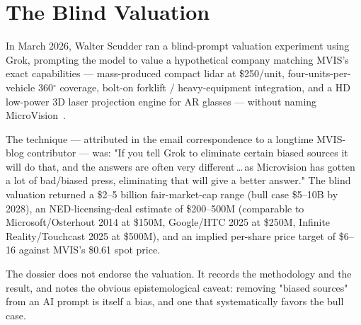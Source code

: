 \documentclass[10pt,letterpaper,twocolumn]{article}
\begin{document}
\begin{table}[h]
\footnotesize
\centering
\setlength{\tabcolsep}{4pt}
\caption{Acquirability arithmetic. AIM's own \$50M raise is small for an outright \$190M acquisition; a syndicate-led deal led by DCVC and one or more of AIM's other backers is more likely, or a deep partnership / licensing arrangement that precedes an acquisition.}
\label{tab:aim}
\end{table}

\section{The Blind Valuation}

In March 2026, Walter Scudder ran a blind-prompt valuation experiment using Grok, prompting the model to value a hypothetical company matching MVIS's exact capabilities --- mass-produced compact lidar at \$250/unit, four-units-per-vehicle 360\(^\circ\) coverage, bolt-on forklift / heavy-equipment integration, and a HD low-power 3D laser projection engine for AR glasses --- without naming MicroVision~\citep{scudder2026grok}.

The technique --- attributed in the email correspondence to a longtime MVIS-blog contributor --- was: "If you tell Grok to eliminate certain biased sources it will do that, and the answers are often very different\,\ldots\,as Microvision has gotten a lot of bad/biased press, eliminating that will give a better answer." The blind valuation returned a \$2--5 billion fair-market-cap range (bull case \$5--10B by 2028), an NED-licensing-deal estimate of \$200--500M (comparable to Microsoft/Osterhout 2014 at \$150M, Google/HTC 2025 at \$250M, Infinite Reality/Touchcast 2025 at \$500M), and an implied per-share price target of \$6--16 against MVIS's \$0.61 spot price.

The dossier does not endorse the valuation. It records the methodology and the result, and notes the obvious epistemological caveat: removing "biased sources" from an AI prompt is itself a bias, and one that systematically favors the bull case.
\end{document}
